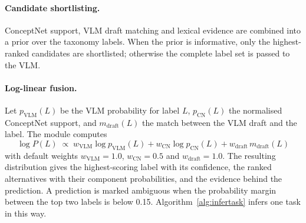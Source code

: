 \documentclass[12pt,a4paper,oneside]{report}
\begin{document}
\paragraph{Candidate shortlisting.} ConceptNet support, VLM draft matching and
lexical evidence are combined into a prior over the taxonomy labels. When the
prior is informative, only the highest-ranked candidates are shortlisted;
otherwise the complete label set is passed to the VLM.

\paragraph{Log-linear fusion.} Let $p_{\text{VLM}}(L)$ be the VLM probability
for label $L$, $p_{\text{CN}}(L)$ the normalised ConceptNet support, and
$m_{\text{draft}}(L)$ the match between the VLM draft and the label. The module
computes
\begin{equation}
  \log P(L) \;\propto\; w_{\text{VLM}} \log p_{\text{VLM}}(L)
  + w_{\text{CN}} \log p_{\text{CN}}(L)
  + w_{\text{draft}}\, m_{\text{draft}}(L)
  \label{eq:fusion}
\end{equation}
with default weights $w_{\text{VLM}} = 1.0$, $w_{\text{CN}} = 0.5$ and
$w_{\text{draft}} = 1.0$. The resulting distribution gives the highest-scoring
label with its confidence, the ranked alternatives with their component
probabilities, and the evidence behind the prediction. A prediction is marked
ambiguous when the probability margin between the top two labels is below 0.15.
Algorithm~\ref{alg:infertask} infers one task in this way.
\end{document}

